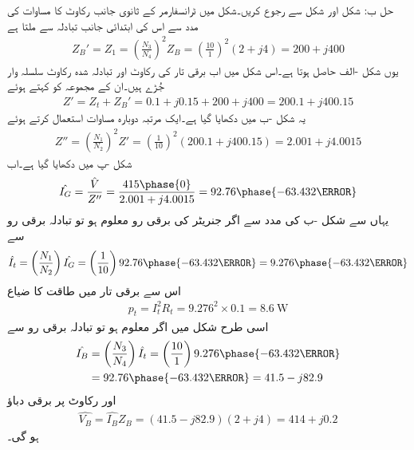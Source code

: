حل ب:
شکل  اور شکل   سے رجوع کریں۔شکل   میں ٹرانسفارمر  کے ثانوی جانب رکاوٹ کا مساوات   کی مدد سے اس کی ابتدائی جانب تبادلہ سے ملتا ہے
\begin{align*}
Z_B'=Z_1=\left(\frac{N_3}{N_4} \right)^2 Z_B=\left(\frac{10}{1} \right)^2 \left(2+j 4 \right)=200+j 400
\end{align*}
یوں شکل -الف حاصل ہوتا ہے۔اس شکل میں اب برقی تار کی رکاوٹ اور  تبادلہ شدہ رکاوٹ سلسلہ وار جُڑے ہیں۔ان کے مجموعہ  کو  کہتے ہوئے
\begin{align*}
Z'=Z_t+Z_B'=0.1+j 0.15+200+j 400=200.1+j400.15
\end{align*}
یہ شکل -ب میں دکھایا گیا ہے۔ایک مرتبہ دوبارہ مساوات   استعمال کرتے ہوئے
\begin{align*}
Z''=\left(\frac{N_1}{N_2} \right)^2 Z'=\left(\frac{1}{10} \right)^2 \left(200.1+j400.15 \right)=2.001+j4.0015
\end{align*}
شکل -پ میں دکھایا گیا ہے۔اب
\begin{align*}
\hat{I_G}=\frac{\hat{V}}{Z''}=\frac{415\phase{0}}{2.001+j4.0015}=92.76\phase{-63.432\degree}
\end{align*}
یہاں سے شکل -ب  کی مدد سے اگر جنریٹر کی برقی رو معلوم ہو تو تبادلہ برقی رو سے
\begin{align*}
\hat{I_t}=\left(\frac{N_1}{N_2} \right) \hat{I_G}=\left(\frac{1}{10}\right) 92.76\phase{-63.432\degree}=9.276\phase{-63.432\degree}
\end{align*}
اس سے برقی تار میں طاقت کا ضیاع
\begin{align*}
p_t=I_t^2 R_t=9.276^2  \times 0.1=\SI{8.6}{\watt}
\end{align*}
اسی طرح شکل   میں اگر  معلوم ہو تو تبادلہ برقی رو سے
\begin{align*}
\hat{I_B}&=\left(\frac{N_3}{N_4}\right) \hat{I_t}=\left(\frac{10}{1}\right) 9.276\phase{-63.432\degree}\\
&=92.76\phase{-63.432\degree}=41.5-j 82.9
\end{align*}
اور رکاوٹ پر برقی دباؤ
\begin{align*}
\hat{V_B}=\hat{I_B} Z_B=\left(41.5-j 82.9 \right) \left(2+j 4 \right)=414+j 0.2
\end{align*}
ہو گی۔


